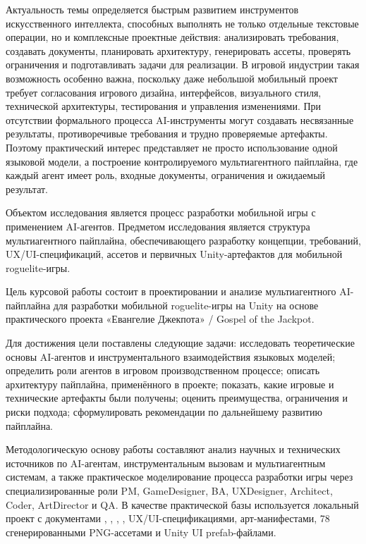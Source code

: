 \documentclass[a4paper,12pt]{report}
\newcommand{\file}[1]{\path{#1}}
\begin{document}
\titlePage

\clearpage
\tableofcontents

\glsaddall
\acronymsChapter

\introChapter

Актуальность темы определяется быстрым развитием инструментов искусственного интеллекта, способных выполнять не только отдельные текстовые операции, но и комплексные проектные действия: анализировать требования, создавать документы, планировать архитектуру, генерировать ассеты, проверять ограничения и подготавливать задачи для реализации. В игровой индустрии такая возможность особенно важна, поскольку даже небольшой мобильный проект требует согласования игрового дизайна, интерфейсов, визуального стиля, технической архитектуры, тестирования и управления изменениями. При отсутствии формального процесса AI-инструменты могут создавать несвязанные результаты, противоречивые требования и трудно проверяемые артефакты. Поэтому практический интерес представляет не просто использование одной языковой модели, а построение контролируемого мультиагентного пайплайна, где каждый агент имеет роль, входные документы, ограничения и ожидаемый результат.

Объектом исследования является процесс разработки мобильной игры с применением AI-агентов. Предметом исследования является структура мультиагентного пайплайна, обеспечивающего разработку концепции, требований, UX/UI-спецификаций, ассетов и первичных Unity-артефактов для мобильной roguelite-игры.

Цель курсовой работы состоит в проектировании и анализе мультиагентного AI-пайплайна для разработки мобильной roguelite-игры на Unity на основе практического проекта «Евангелие Джекпота» / Gospel of the Jackpot.

Для достижения цели поставлены следующие задачи: исследовать теоретические основы AI-агентов и инструментального взаимодействия языковых моделей; определить роли агентов в игровом производственном процессе; описать архитектуру пайплайна, применённого в проекте; показать, какие игровые и технические артефакты были получены; оценить преимущества, ограничения и риски подхода; сформулировать рекомендации по дальнейшему развитию пайплайна.

Методологическую основу работы составляют анализ научных и технических источников по AI-агентам, инструментальным вызовам и мультиагентным системам, а также практическое моделирование процесса разработки игры через специализированные роли PM, GameDesigner, BA, UXDesigner, Architect, Coder, ArtDirector и QA. В качестве практической базы используется локальный проект с документами \file{AGENTS.md}, \file{STATUS.md}, \file{TASKS.md}, \file{GDD.md}, UX/UI-спецификациями, арт-манифестами, 78 сгенерированными PNG-ассетами и Unity UI prefab-файлами.
\end{document}
